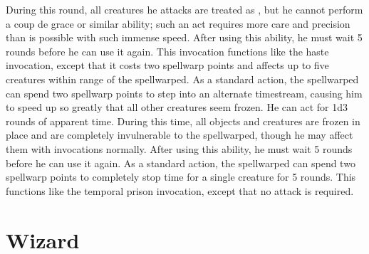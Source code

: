 During this round, all creatures he attacks are treated as \helpless, but he cannot perform a coup de grace or similar ability; such an act requires more care and precision than is possible with such immense speed.
After using this ability, he must wait 5 rounds before he can use it again.
This invocation functions like the haste invocation, except that it costs two spellwarp points and affects up to five creatures within \rngclose range of the spellwarped.
As a standard action, the spellwarped can spend two spellwarp points to step into an alternate timestream, causing him to speed up so greatly that all other creatures seem frozen.
He can act for 1d3 rounds of apparent time.
During this time, all objects and creatures are frozen in place and are completely invulnerable to the spellwarped, though he may affect them with invocations normally.
After using this ability, he must wait 5 rounds before he can use it again.
As a standard action, the spellwarped can spend two spellwarp points to completely stop time for a single creature for 5 rounds.
This functions like the temporal prison invocation, except that no attack is required.
\norepeatnotes

\section{Wizard}

